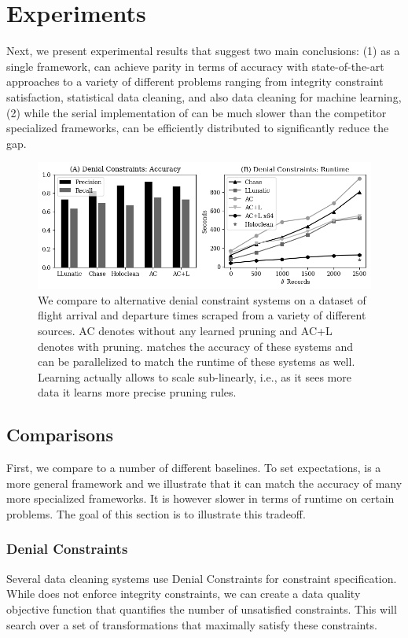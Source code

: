 \section{Experiments}\label{s:exp}
Next, we present experimental results that suggest two main conclusions: (1) as a single framework, \sys can achieve parity in terms of accuracy with state-of-the-art approaches to a variety of different problems ranging from integrity constraint satisfaction, statistical data cleaning, and also data cleaning for machine learning, (2) while the serial implementation of \sys can be much slower than the competitor specialized frameworks, \sys can be efficiently distributed to significantly reduce the gap.

\begin{figure}
    \centering
    \includegraphics[width=\columnwidth]{exp/exp1.png}
    \caption{We compare \sys to alternative denial constraint systems on a dataset of flight arrival and departure times scraped from a variety of different sources. AC denotes \sys without any learned pruning and AC+L denotes \sys with pruning.
    \sys matches the accuracy of these systems and can be parallelized to match the runtime of these systems as well. Learning actually allows \sys to scale sub-linearly, i.e., as it sees more data it learns more precise pruning rules.\label{exp1a}}
\end{figure}

\subsection{Comparisons}
First, we compare \sys to a number of different baselines. To set expectations, \sys is a more general framework and we illustrate that it can match the accuracy of many more specialized frameworks. It is however slower in terms of runtime on certain problems. The goal of this section is to illustrate this tradeoff.

\subsubsection{Denial Constraints}
Several data cleaning systems use Denial Constraints for constraint specification. 
While \sys does not enforce integrity constraints, we can create a data quality objective function that quantifies the number of unsatisfied constraints.
This will search over a set of transformations that maximally satisfy these constraints.

